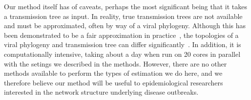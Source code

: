 \documentclass[12pt]{article}\usepackage[]{graphicx}\usepackage[]{color}
\begin{document}
Our method itself has of caveats, perhaps the most significant being that it
takes a transmission tree as input. In reality, true transmission trees are not
available and must be approximated, often by way of a viral phylogeny. Although
this has been demonstrated to be a fair approximation in
practice~\autocite[e.g.][]{leitner1996accurate}, the topologies of a viral
phylogeny and transmission tree can differ
significantly~\autocite{ypma2013relating}. In addition, it is computationally
intensive, taking about a day when run on 20 cores in parallel with the setings
we described in the methods. However, there are no other methods available to
perform the types of estimation we do here, and we therefore believe our method
will be useful to epidemiological researchers interested in the network
structure underlying disease outbreaks.

\setcounter{figure}{0}
\renewcommand{\thefigure}{S\arabic{figure}}

\printbibliography
\end{document}
